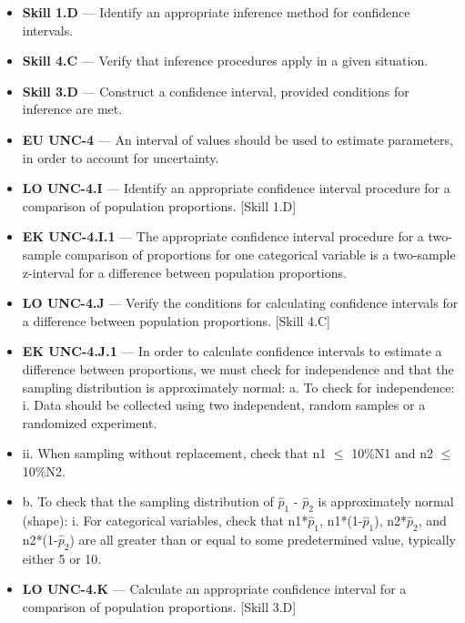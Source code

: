 \documentclass[11pt]{article}
\begin{document}


{\small
\begin{itemize}[leftmargin=1.5em,itemsep=2pt,topsep=2pt]
  \item \textbf{Skill 1.D} --- Identify an appropriate inference method for confidence intervals.
  \item \textbf{Skill 4.C} --- Verify that inference procedures apply in a given situation.
  \item \textbf{Skill 3.D} --- Construct a confidence interval, provided conditions for inference are met.
  \item \textbf{EU UNC-4} --- An interval of values should be used to estimate parameters, in order to account for uncertainty.
  \item \textbf{LO UNC-4.I} --- Identify an appropriate confidence interval procedure for a comparison of population proportions. [Skill 1.D]
  \item \textbf{EK UNC-4.I.1} --- The appropriate confidence interval procedure for a two-sample comparison of proportions for one categorical variable is a two-sample z-interval for a difference between population proportions.
  \item \textbf{LO UNC-4.J} --- Verify the conditions for calculating confidence intervals for a difference between population proportions. [Skill 4.C]
  \item \textbf{EK UNC-4.J.1} --- In order to calculate confidence intervals to estimate a difference between proportions, we must check for independence and that the sampling distribution is approximately normal: a. To check for independence: i. Data should be collected using two independent, random samples or a randomized experiment.
  \item ii. When sampling without replacement, check that n1 $\leq$ 10\%N1 and n2 $\leq$ 10\%N2.
  \item b. To check that the sampling distribution of $\widehat p_1$ - $\widehat p_2$ is approximately normal (shape): i. For categorical variables, check that n1*$\widehat p_1$, n1*(1-$\widehat p_1$), n2*$\widehat p_2$, and n2*(1-$\widehat p_2$) are all greater than or equal to some predetermined value, typically either 5 or 10.
  \item \textbf{LO UNC-4.K} --- Calculate an appropriate confidence interval for a comparison of population proportions. [Skill 3.D]

\end{itemize}}
\end{document}
